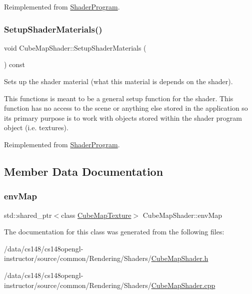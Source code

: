 Reimplemented from \hyperlink{class_shader_program_a20b5ed7b5f81154025eb7b6f1be70f84}{Shader\+Program}.

\hypertarget{class_cube_map_shader_a9deaf42646258af9237751f331fb215a}{}\label{class_cube_map_shader_a9deaf42646258af9237751f331fb215a} 
\subsubsection{\texorpdfstring{Setup\+Shader\+Materials()}{SetupShaderMaterials()}}
{\footnotesize\ttfamily void Cube\+Map\+Shader\+::\+Setup\+Shader\+Materials (\begin{DoxyParamCaption}{ }\end{DoxyParamCaption}) const\hspace{0.3cm}{\ttfamily [virtual]}}



Sets up the shader material (what this material is depends on the shader). 

This functions is meant to be a general setup function for the shader. This function has no access to the scene or anything else stored in the application so its primary purpose is to work with objects stored within the shader program object (i.\+e. textures). 

Reimplemented from \hyperlink{class_shader_program_a20ea5669f122fa6143e7fa8ee9d92578}{Shader\+Program}.



\subsection{Member Data Documentation}
\hypertarget{class_cube_map_shader_ab9ea944d2b14c6a47406e36d9046caa6}{}\label{class_cube_map_shader_ab9ea944d2b14c6a47406e36d9046caa6} 
\subsubsection{\texorpdfstring{env\+Map}{envMap}}
{\footnotesize\ttfamily std\+::shared\+\_\+ptr$<$class \hyperlink{class_cube_map_texture}{Cube\+Map\+Texture}$>$ Cube\+Map\+Shader\+::env\+Map\hspace{0.3cm}{\ttfamily [private]}}



The documentation for this class was generated from the following files\+:\begin{DoxyCompactItemize}
\item 
/data/cs148/cs148opengl-\/instructor/source/common/\+Rendering/\+Shaders/\hyperlink{_cube_map_shader_8h}{Cube\+Map\+Shader.\+h}\item 
/data/cs148/cs148opengl-\/instructor/source/common/\+Rendering/\+Shaders/\hyperlink{_cube_map_shader_8cpp}{Cube\+Map\+Shader.\+cpp}\end{DoxyCompactItemize}
